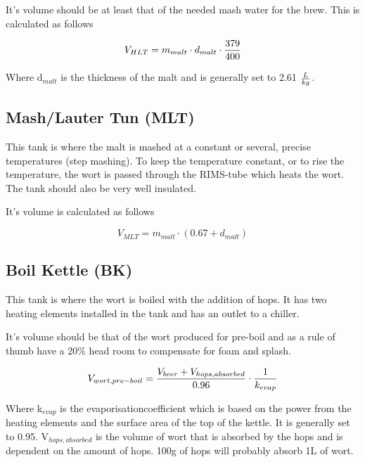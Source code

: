 \documentclass[11pt,fleqn,openany]{book} %
\begin{document}
It's volume should be at least that of the needed mash water for the brew. This is calculated as follows

\begin{equation}
V_{HLT} = m_{malt} \cdot d_{malt} \cdot {379 \over 400}
\end{equation}

Where d$_{malt}$ is the thickness of the malt and is generally set to 2.61 $L\over kg $.

\subsection{Mash/Lauter Tun (MLT)}

This tank is where the malt is mashed at a constant or several, precise temperatures (step mashing). To keep the temperature constant, or to rise the temperature, the wort is passed through the RIMS-tube which heats the wort. The tank should also be very well insulated.

It's volume is calculated as follows

\begin{equation}
V_{MLT} = m_{malt} \cdot (0.67 + d_{malt})
\end{equation}

\subsection{Boil Kettle (BK)}

This tank is where the wort is boiled with the addition of hops. It has two heating elements installed in the tank and has an outlet to a chiller.

It's volume should be that of the wort produced for pre-boil and as a rule of thumb have a 20\% head room to compensate for foam and splash.

\begin{equation}
V_{wort, pre-boil} = {{V_{beer} + V_{hops, absorbed}} \over 0.96} \cdot {1 \over k_{evap}}
\end{equation}

Where k$_{evap}$ is the evaporisationcoefficient which is based on the power from the heating elements and the surface area of the top of the kettle. It is generally set to 0.95. V$_{hops, absorbed}$ is the volume of wort that is absorbed by the hops and is dependent on the amount of hops. 100g of hops will probably absorb 1L of wort.
\end{document}
